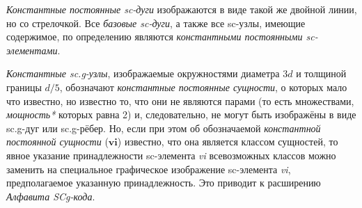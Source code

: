 \begin{SCn}
\begin{scnstruct}
\begin{scnsubstruct}
{\begin{scnitemize}
                    \item \textit{Константные постоянные sc-дуги} изображаются в виде такой же двойной линии, но со стрелочкой. Все \textit{базовые sc-дуги}, а также все sc-узлы, имеющие содержимое, по определению являются \textit{константными постоянными sc-элементами}.
                    \item \textit{Константные sc.g-узлы}, изображаемые окружностями диаметра $3d$ и толщиной границы $d/5$, обозначают \textit{константные постоянные сущности}, о которых мало что известно, но известно то, что они не являются парами (то есть множествами, \textit{мощность*} которых равна 2) и, следовательно, не могут быть изображёны в виде sc.g-дуг или sc.g-рёбер. Но, если при этом об обозначаемой \textit{константной постоянной сущности} ($\bm{vi}$) известно, что она является классом сущностей, то явное указание принадлежности sc-элемента \textit{vi} всевозможных классов можно заменить на специальное графическое изображение sc-элемента \textit{vi}, предполагаемое указанную принадлежность. Это приводит к расширению  \textit{Алфавита SCg-кода}.
                \end{scnitemize}}
            \begin{scnindent}
            \end{scnindent}
            \begin{scnindent}
            \end{scnindent}


\end{scnsubstruct}
\end{scnstruct}
\end{SCn}
